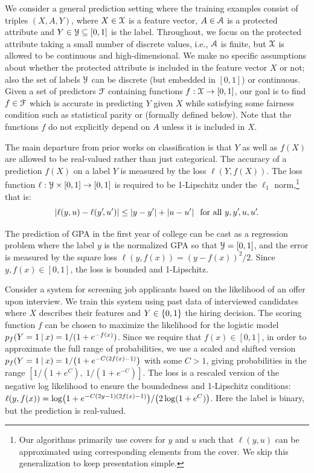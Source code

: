 \documentclass{article}
\begin{document}
We consider a general prediction setting where the training examples consist of triples $(X,A,Y)$, where $X \in \mathcal{X}$ is a feature vector,
$A \in \mathcal{A}$ is a protected attribute and $Y \in \mathcal{Y}\subseteq[0,1]$ is the label. Throughout, we focus on the protected attribute taking a small
number of discrete values, i.e., $\mathcal{A}$ is finite, but $\mathcal{X}$ is allowed to be continuous and high-dimensional. We make no specific assumptions about whether
the protected attribute is included in the feature vector $X$ or not; also the set of labels $\mathcal{Y}$ can be discrete (but embedded in $[0,1]$) or continuous.
Given a set of predictors $\mathcal{F}$ containing functions $f:\mathcal{X}\to [0,1]$, our goal is to find $f \in \mathcal{F}$ which is accurate in predicting $Y$ given $X$
while satisfying some fairness condition such as statistical parity or \ep (formally defined below).
Note that the functions $f$ do not explicitly depend on $A$ unless it is included in $X$.

The main departure from prior works on classification is that $Y$ as well as $f(X)$ are allowed to be real-valued rather than just categorical.
The accuracy
of a prediction $f(X)$ on a label $Y$ is measured by the loss $\ell(Y,f(X))$. The loss function
$\ell:\mathcal{Y}\times[0,1]\to [0,1]$ is required to be 1-Lipschitz under the $\ell_1$ norm,\footnote{Our algorithms primarily use covers for $y$ and $u$ such that $\ell(y,u)$ can be approximated using corresponding elements from the cover. We skip this generalization to keep presentation simple.} that is:
\[
\left|\ell(y,u) - \ell(y'\!,u')\right| \leq \left\lvert y-y'\right\rvert+\left\lvert u-u'\right\rvert\;\;\text{for all $y,y'\!,u,u'\!$.}
\]

\begin{example}
\label{ex:lsreg}
The prediction of GPA in the first year of college
can be cast as a regression problem where the label $y$ is the normalized GPA so that $\mathcal{Y} = [0,1]$, and the error is measured by the square loss $\ell(y,f(x)) = (y-f(x))^2/2$. Since $y,f(x) \in [0,1]$, the loss is bounded and
1-Lipschitz.
\end{example}

\begin{example}
\label{ex:logreg}
    Consider a system for screening job applicants based on the likelihood of an offer upon interview.
    We train this system using past data of interviewed candidates where $X$ describes their features and $Y\in\{0,1\}$
    the hiring decision. The scoring function $f$ can be chosen to maximize the likelihood for
    the logistic model $p_{f}(Y=1\mathbin{\vert} x)=1/(1+e^{-f(x)})$.
    Since we require that $f(x)\in[0,1]$, in order to approximate the full range of probabilities, we use a scaled and shifted version
    $p_{f}(Y=1\mathbin{\vert} x)=1/\bigl(1+e^{-C(2f(x)-1)}\bigr)$ with some $C>1$, giving probabilities in the range $[1/(1+e^C),\;1/(1+e^{-C})]$.
    The loss is a rescaled version of the negative log likelihood to ensure the boundedness and 1-Lipschitz conditions: $\ell(y,f(x)) = \log\bigl(1 + e^{-C(2y-1)(2f(x)-1)}\bigr)/\bigl(2\log(1+e^C)\bigr)$.
    Here
    the label is binary, but the prediction is real-valued.
\end{example}
\end{document}
